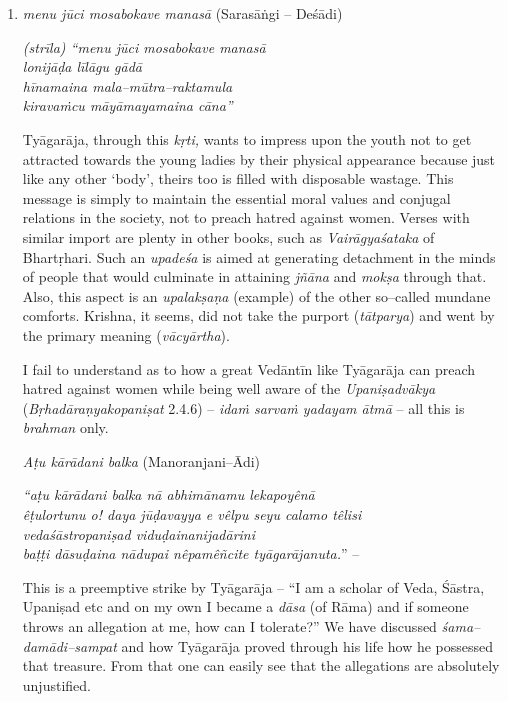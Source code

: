 \begin{enumerate}
\itemsep=0pt
\item 
 \textit{menu jūci mosabokave manasā} (Sarasāṅgi – Deśādi)

\begin{myquote}
\textit{(strīla) “menu jūci mosabokave manasā}\\\textit{lonijāḍa līlāgu gādā}\\\textit{hīnamaina mala–mūtra–raktamula}\\\textit{kiravaṁcu māyāmayamaina cāna”}
\end{myquote}

 Tyāgarāja, through this \textit{kṛti,} wants to impress upon the youth not to get attracted towards the young ladies by their physical appearance because just like any other ‘body’, theirs too is filled with disposable wastage. This message is simply to maintain the essential moral values and conjugal relations in the society, not to preach hatred against women. Verses with similar import are plenty in other books, such as \textit{Vairāgyaśataka} of Bhartṛhari. Such an \textit{upadeśa} is aimed at generating detachment in the minds of people that would culminate in attaining \textit{jñāna} and \textit{mokṣa} through that. Also, this aspect is an \textit{upalakṣaṇa} (example) of the other so–called mundane comforts. Krishna, it seems, did not take the purport (\textit{tātparya}) and went by the primary meaning (\textit{vācyārtha}).

 I fail to understand as to how a great Vedāntīn like Tyāgarāja can preach hatred against women while being well aware of the \textit{Upaniṣadvākya} (\textit{Bṛhadāraṇyakopaniṣat} 2.4.6) – \textit{idaṁ sarvaṁ yadayam ātmā} – all this is \textit{brahman} only.

 \textit{Aṭu kārādani balka} (Manoranjani–Ādi)

\begin{myquote}
\textit{“aṭu kārādani balka nā abhimānamu lekapoyênā} \\\textit{êṭulortunu o! daya jūḍavayya e vêlpu seyu calamo têlisi}\\\textit{vedaśāstropaniṣad viduḍainanijadārini} \\\textit{baṭṭi dāsuḍaina nādupai nêpamêñcite tyāgarājanuta.}” –
\end{myquote}

 This is a preemptive strike by Tyāgarāja – “I am a scholar of Veda, Śāstra, Upaniṣad etc and on my own I became a \textit{dāsa} (of Rāma) and if someone throws an allegation at me, how can I tolerate?” We have discussed \textit{śama–damādi–sampat} and how Tyāgarāja proved through his life how he possessed that treasure. From that one can easily see that the allegations are absolutely unjustified.


\end{enumerate}
